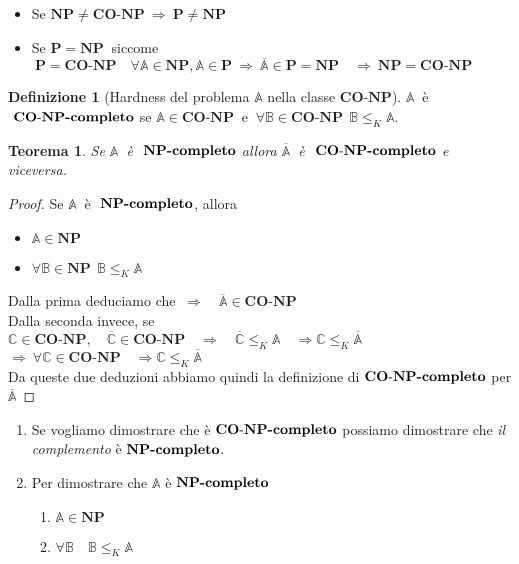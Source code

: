 \documentclass[a4paper]{article}
\newtheorem{thm}{Teorema}[subsection]
\theoremstyle{definition}
\newtheorem{definit}{Definizione}[subsection]
\newcommand{\p}{\mathbf{P}}
\newcommand{\np}{\mathbf{NP}}
\newcommand{\conp}{\mathbf{CO}\text{-}\mathbf{NP}}
\newcommand{\prob}[1]{\mathbb{#1}}
\begin{document}
 		\begin{itemize}
 			\item Se $ \np\neq \conp \ \Rightarrow \ \p\neq\np $
 			\item Se $ \p = \np\ $ siccome $ \ \p = \conp\quad \forall \prob{A}\in \np , \prob{A}\in \p \ \Rightarrow \ \overline{\prob{A}}\in \p = \np \quad \Rightarrow \ \np = \conp $ 
 		\end{itemize}
 		
 		\begin{definit}[Hardness del problema $ \prob{A} $ nella classe $ \conp $]
 			$ \prob{A}\ $ è $ \ \conp\text{\textbf{-completo}} $ se $ \prob{A}\in \conp\ $ e $ \ \forall \prob{B} \in \conp \ \ \prob{B}\leq_K\prob{A} $. 
 		\end{definit}
 		
 		\begin{thm}
 			Se $ \prob{A}\ $ è $ \ \np\text{\textbf{-completo}} $ allora $ \overline{\prob{A}}\ $ è  $ \ \conp\text{\textbf{-completo}} $ e viceversa.
 		\end{thm}
 		
 		\begin{proof}
 			Se $ \prob{A}\ $ è $ \ \np\text{\textbf{-completo}} $, allora
 			\begin{itemize}
 				\item $ \prob{A}\in\np $
 				\item $ \forall \prob{B} \in \np \ \ \prob{B}\leq_K\prob{A} $
 			\end{itemize}
 			Dalla prima deduciamo che $\  \Rightarrow\quad \overline{\prob{A}}\in\conp $ \\
  			Dalla seconda invece, se $ \prob{C}\in\conp,\quad \overline{\prob{C}}\in \conp \quad \Rightarrow \quad
  			\overline{\prob{C}}\leq_K\prob{A}\quad \Rightarrow \prob{C}\leq_K\overline{\prob{A}} $\\
  			$ \Rightarrow \ \forall\prob{C}\in\conp \quad \Rightarrow \prob{C}\leq_K\overline{\prob{A}}  $\\
  			Da queste due deduzioni abbiamo quindi la definizione di $ \conp\text{\textbf{-completo}} $ per $ \overline{\prob{A}} $
 		\end{proof}
 		
 		\begin{enumerate}
 			\item Se vogliamo dimostrare che è $ \conp\text{\textbf{-completo}} $ possiamo dimostrare che \textit{il complemento} è $ \np\text{\textbf{-completo}} $.
 			\item Per dimostrare che $ \prob{A} $ è $ \np\text{\textbf{-completo}} $
 			\begin{enumerate}
 				\item $ \prob{A} \in \np $
 				\item $ \forall\prob{B} \quad \prob{B}\leq_K \prob{A} $
 			\end{enumerate}
 		\end{enumerate}
 		
\end{document}
